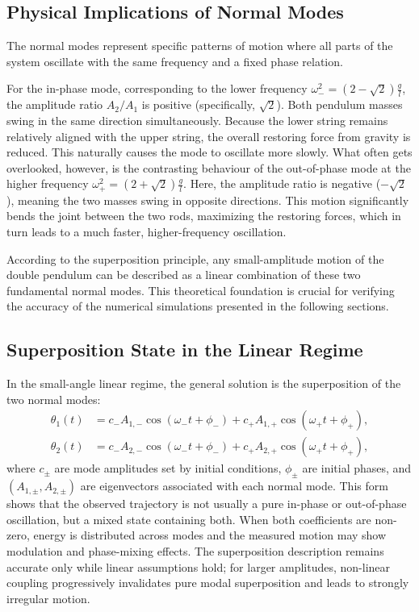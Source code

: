 \documentclass[12pt, a4paper, twoside]{article}
\begin{document}
\subsection{Physical Implications of Normal Modes}
The normal modes represent specific patterns of motion where all parts of the system oscillate with the same frequency and a fixed phase relation. 

For the in-phase mode, corresponding to the lower frequency $\omega_-^2 = (2 - \sqrt{2})\frac{g}{l}$, the amplitude ratio $A_2/A_1$ is positive (specifically, $\sqrt{2}$). Both pendulum masses swing in the same direction simultaneously. Because the lower string remains relatively aligned with the upper string, the overall restoring force from gravity is reduced. This naturally causes the mode to oscillate more slowly. What often gets overlooked, however, is the contrasting behaviour of the out-of-phase mode at the higher frequency $\omega_+^2 = (2 + \sqrt{2})\frac{g}{l}$. Here, the amplitude ratio is negative ($-\sqrt{2}$), meaning the two masses swing in opposite directions. This motion significantly bends the joint between the two rods, maximizing the restoring forces, which in turn leads to a much faster, higher-frequency oscillation. 

According to the superposition principle, any small-amplitude motion of the double pendulum can be described as a linear combination of these two fundamental normal modes. This theoretical foundation is crucial for verifying the accuracy of the numerical simulations presented in the following sections.

\subsection{Superposition State in the Linear Regime}
In the small-angle linear regime, the general solution is the superposition of the two normal modes:
\begin{equation}
\begin{aligned}
\theta_1(t) &= c_- A_{1,-}\cos(\omega_- t + \phi_-) + c_+ A_{1,+}\cos(\omega_+ t + \phi_+), \\
\theta_2(t) &= c_- A_{2,-}\cos(\omega_- t + \phi_-) + c_+ A_{2,+}\cos(\omega_+ t + \phi_+),
\end{aligned}
\end{equation}
where $c_{\pm}$ are mode amplitudes set by initial conditions, $\phi_{\pm}$ are initial phases, and $(A_{1,\pm}, A_{2,\pm})$ are eigenvectors associated with each normal mode. This form shows that the observed trajectory is not usually a pure in-phase or out-of-phase oscillation, but a mixed state containing both. When both coefficients are non-zero, energy is distributed across modes and the measured motion may show modulation and phase-mixing effects. The superposition description remains accurate only while linear assumptions hold; for larger amplitudes, non-linear coupling progressively invalidates pure modal superposition and leads to strongly irregular motion.
\end{document}
